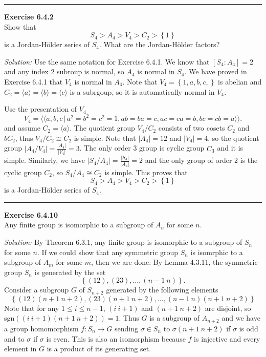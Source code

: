 \documentclass[a4paper, 12pt]{article}
\newenvironment{problem}[2][Exercise]
    { \begin{mdframed}[backgroundcolor=gray!20] \textbf{#1 #2} \\}
    {  \end{mdframed}}
\newenvironment{solution}
    {\textit{Solution:}}
    {}
\newcommand{\la}{\langle}
\newcommand{\ra}{\rangle}
\begin{document}
\noindent\rule{7in}{2.8pt}
\begin{problem}{6.4.2}
Show that 
\[S_4>A_4>V_4>C_2>\left\{ 1 \right\}\]
is a Jordan-H\"{o}lder series of \(S_4\). What are the Jordan-H\"{o}lder factors?
\end{problem}
\begin{solution}
Use the same notation for Exercise 6.4.1. We know that \([S_4:A_4]=2\) and any index 2 subroup is normal, so \(A_4\) is normal in \(S_4\). We have proved in Exercise 6.4.1 that \(V_4\) is normal in \(A_4\). Note that \(V_4=\left\{ 1,a,b,c, \right\}\) is abelian and 
\(C_2=\la a\ra=\la b\ra =\la c\ra\) is a subrgoup, so it is automatically normal in \(V_4\). 

Use the presentation of \(V_4\)
\[V_4=\la\la a,b,c\,|\, a^2=b^2=c^2=1, ab=ba=c,ac=ca=b,bc=cb=a\ra\ra.\]
and assume \(C_2=\la a\ra\). The quotient group \(V_4/C_2\) consists of two cosets \(C_2\) and \(bC_2\), thus \(V_4/C_2\cong C_2\) is simple.  
Note that \(|A_4|=12\) and \(|V_4|=4\), so the quotient group \(|A_4/V_4|=\frac{|A_4|}{|V_4|}=3\). The only order 3 group is cyclic group \(C_3\) and it is simple. 
Similarly, we have \(|S_4/A_4|=\frac{|S_4|}{|A_4|}=2\) and the only group of order 2 is the cyclic group \(C_2\), so \(S_4/A_4\cong C_2\) is simple. This proves that 
\[S_4>A_4>V_4>C_2>\left\{ 1 \right\}\]
is a Jordan-H\"{o}lder series of \(S_4\).
\end{solution}

\noindent\rule{7in}{2.8pt}
\begin{problem}{6.4.10}
Any finite group is isomorphic to a subgroup of \(A_n\) for some \(n\).
\end{problem}
\begin{solution}
By Theorem 6.3.1, any finite group is isomorphic to a subgroup of \(S_n\) for some \(n\). If we could show that any symmetric group \(S_n\) is isomrphic to a 
subgroup of \(A_m\) for some \(m\), then we are done. By Lemma 4.3.11, the symmetric group \(S_n\) is generated by the set 
\[\left\{ (12),(23),\ldots,(n-1\ n) \right\}.\]
Consider a subgroup \(G\) of \(S_{n+2}\) generated by the following elements 
\[\left\{ (12)(n+1\ n+2),(23)(n+1\ n+2),\ldots,(n-1\ n)(n+1\ n+2) \right\}\]
Note that for any \(1\leq i\leq n-1\), \((i\ i+1)\) and \((n+1\ n+2)\) are disjoint, so sgn\(((i\ i+1)(n+1\ n+2))=1\). Thus \(G\) is a subgroup of \(A_{n+2}\) and we have a 
group homomorphism \(f:S_n\rightarrow G\) sending \(\sigma\in S_n\) to \(\sigma (n+1\ n+2)\) if \(\sigma\) is odd and to \(\sigma\) if \(\sigma\) is even. This is also an isomorphism 
because \(f\) is injective and every element in \(G\) is a product of its generating set.
\end{solution}
\end{document}

